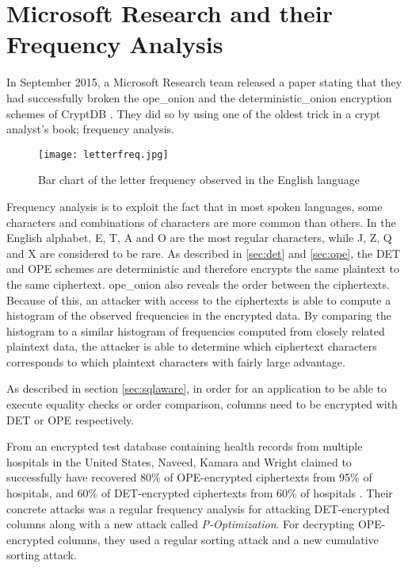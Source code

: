 \section{Microsoft Research and their Frequency Analysis}

In September 2015, a Microsoft Research team released a paper stating that they had successfully broken the \gls{ope_onion} and the \gls{deterministic_onion} encryption schemes of CryptDB \cite{microsoft_cryptdb}. They did so by using one of the oldest trick in a crypt analyst's book; frequency analysis.

\begin{wrapfigure}[14]{r}[1pt]{7.2cm}
\centering
\texttt{[image: letterfreq.jpg]}
\caption{Bar chart of the letter frequency observed in the English language}
\label{fig:letter_freq}
\end{wrapfigure}
Frequency analysis is to exploit the fact that in most spoken languages, some characters and combinations of characters are more common than others. In the English alphabet, E, T, A and O are the most regular characters, while J, Z, Q and X are considered to be rare. As described in \ref{sec:det} and \ref{sec:ope}, the DET and OPE schemes are deterministic and therefore encrypts the same plaintext to the same ciphertext. \gls{ope_onion} also reveals the order between the ciphertexts. Because of this, an attacker with access to the ciphertexts is able to compute a histogram of the observed frequencies in the encrypted data. By comparing the histogram to a similar histogram of frequencies computed from closely related plaintext data, the attacker is able to determine which ciphertext characters corresponds to which plaintext characters with fairly large advantage.

As described in section \ref{sec:sqlaware}, in order for an application to be able to execute equality checks or order comparison, columns need to be encrypted with DET or OPE respectively. 




From an encrypted test database containing health records from multiple hospitals in the United States, Naveed, Kamara and Wright claimed to successfully have recovered 80\% of OPE-encrypted ciphertexts from 95\% of hospitals, and 60\% of DET-encrypted ciphertexts from 60\% of hospitals \cite{microsoft_cryptdb}. Their concrete attacks was a regular frequency analysis for attacking DET-encrypted columns along with a new attack called \emph{P-Optimization}. For decrypting OPE-encrypted columns, they used a regular sorting attack and a new cumulative sorting attack.

